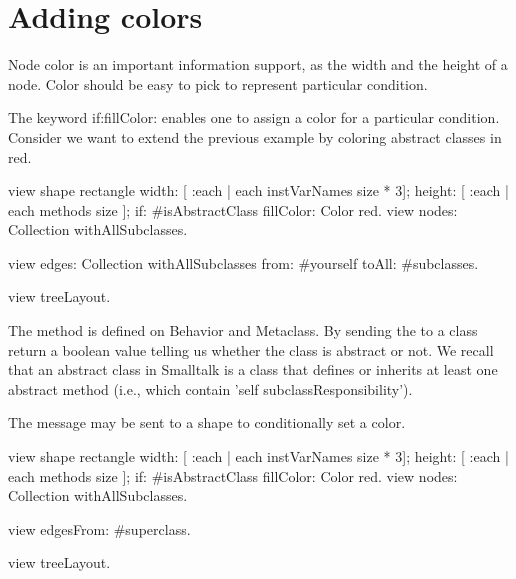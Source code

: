 \documentclass[a4paper,10pt,twoside]{book}
\begin{document}
%
%

\section{Adding colors}
Node color  is an important information support, as the width and the height of a node. Color should be easy to pick to represent particular condition.

The keyword if:fillColor: enables one to assign a color for a particular condition. Consider we want to extend the previous example by coloring abstract classes in red.

\begin{code}{}
view shape rectangle
  width: [ :each | each instVarNames size * 3];
  height: [ :each | each methods size ];
  if: #isAbstractClass fillColor: Color red.
view nodes: Collection withAllSubclasses.

view edges: Collection withAllSubclasses from: #yourself toAll: #subclasses.

view treeLayout.
\end{code}

The method  is defined on Behavior and Metaclass. By sending the  to a class return a boolean value telling us whether the class is abstract or not. We recall that an abstract class in Smalltalk is a class that defines or inherits at least one  abstract method (i.e., which contain 'self subclassResponsibility').

The message  may be sent to a shape to conditionally set a color. 

\begin{code}{}
view shape rectangle
  width: [ :each | each instVarNames size * 3];
  height: [ :each | each methods size ];
  if: #isAbstractClass fillColor: Color red.
view nodes: Collection withAllSubclasses.

view edgesFrom: #superclass.

view treeLayout.
\end{code}
\end{document}
